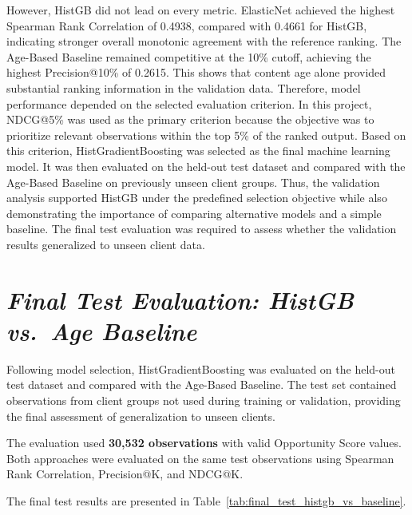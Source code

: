 \documentclass[12pt,a4paper]{report}
\begin{document}
However, HistGB did not lead on every metric. ElasticNet achieved the highest Spearman Rank Correlation of 0.4938, compared with 0.4661 for HistGB, indicating stronger overall monotonic agreement with the reference ranking. The Age-Based Baseline remained competitive at the 10\% cutoff, achieving the highest Precision@10\% of 0.2615. This shows that content age alone provided substantial ranking information in the validation data. Therefore, model performance depended on the selected evaluation criterion. In this project, NDCG@5\% was used as the primary criterion because the objective was to prioritize relevant observations within the top 5\% of the ranked output. Based on this criterion, HistGradientBoosting was selected as the final machine learning model. It was then evaluated on the held-out test dataset and compared with the Age-Based Baseline on previously unseen client groups. Thus, the validation analysis supported HistGB under the predefined selection objective while also demonstrating the importance of comparing alternative models and a simple baseline. The final test evaluation was required to assess whether the validation results generalized to unseen client data.

\section{\textit{Final Test Evaluation: HistGB vs.\ Age Baseline}}

Following model selection, HistGradientBoosting was evaluated on the held-out test dataset and compared with the Age-Based Baseline. The test set contained observations from client groups not used during training or validation, providing the final assessment of generalization to unseen clients.

The evaluation used \textbf{30,532 observations} with valid Opportunity Score values. Both approaches were evaluated on the same test observations using Spearman Rank Correlation, Precision@K, and NDCG@K.

The final test results are presented in Table~\ref{tab:final_test_histgb_vs_baseline}.

\begin{table}[htbp]
\centering
\caption{Final Test Performance: HistGB versus Age-Based Baseline}
\label{tab:final_test_histgb_vs_baseline}
\end{table}
\end{document}
